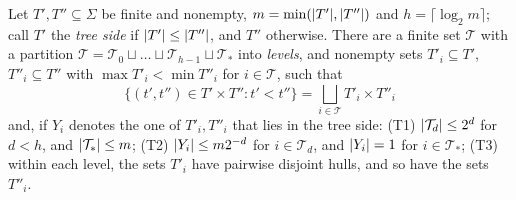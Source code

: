 \begin{lemma}\label{ord:lem:pair-tree}
Let $T',T''\subseteq\Sigma$ be finite and nonempty, $m=\min(\lvert T'\rvert,\lvert T''\rvert)$ and $h=\lceil\log_2m\rceil$; call $T'$
the \emph{tree side} if $\lvert T'\rvert\le\lvert T''\rvert$, and $T''$ otherwise. There are a finite set $\mathcal T$ with a partition
$\mathcal T=\mathcal T_0\sqcup\dots\sqcup\mathcal T_{h-1}\sqcup\mathcal T_\ast$ into \emph{levels}, and nonempty sets
$T'_i\subseteq T'$, $T''_i\subseteq T''$ with $\max T'_i<\min T''_i$ for $i\in\mathcal T$, such that
\begin{equation}\label{ord:eq:pair-partition}
 \{(t',t'')\in T'\times T'':t'<t''\}=\bigsqcup_{i\in\mathcal T}T'_i\times T''_i
\end{equation}
and, if $Y_i$ denotes the one of $T'_i,T''_i$ that lies in the tree side:
\textup{(T1)} $\lvert \mathcal T_d\rvert\le2^d$ for $d<h$, and $\lvert \mathcal T_\ast\rvert\le m$;
\textup{(T2)} $\lvert Y_i\rvert\le m2^{-d}$ for $i\in\mathcal T_d$, and $\lvert Y_i\rvert=1$ for $i\in\mathcal T_\ast$;
\textup{(T3)} within each level, the sets $T'_i$ have pairwise disjoint hulls, and so have the sets $T''_i$.
\end{lemma}

